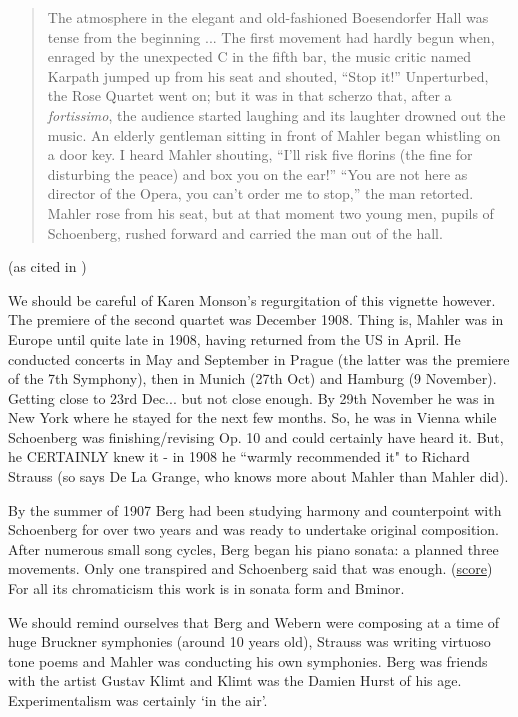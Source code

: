 \begin{quotation}
The atmosphere in the elegant and old-fashioned Boesendorfer Hall was tense from the beginning ... The first 
movement had hardly begun when, enraged by the unexpected C in the fifth bar, the music critic named Karpath 
jumped up from his seat and shouted, ``Stop it!'' Unperturbed, the Rose Quartet went on; but it was in that 
scherzo that, after a \textit{fortissimo}, the audience started laughing and its laughter drowned out the 
music. An elderly gentleman sitting in front of Mahler began whistling on a door key. I heard Mahler 
shouting, ``I'll risk five florins (the fine for disturbing the peace) and box you on the ear!'' ``You are 
not here as director of the Opera, you can't order me to stop,'' the man retorted. Mahler rose from his seat, 
but at that moment two young men, pupils of Schoenberg, rushed forward and carried the man out of the hall.
\citep[p32]{monson1979alban}
\end{quotation} 

\citet{featherstone00} (as cited in \citealt{thomas02})

We should be careful of Karen Monson's  regurgitation of this vignette however. The premiere of the second 
quartet was December 1908. Thing is, Mahler was in Europe until quite late in 1908, having returned from the 
US in April. He conducted concerts in May and September in Prague (the latter was the premiere of the 7th 
Symphony), then in Munich (27th Oct) and Hamburg (9 November). Getting close to 23rd Dec... but not close 
enough. By 29th November he was in New York where he stayed for the next few months. So, he was in Vienna 
while Schoenberg was finishing/revising Op. 10 and could certainly have heard it. But, he CERTAINLY knew it - 
in 1908 he ``warmly recommended it" to Richard Strauss (so says De La Grange, who knows more about Mahler 
than Mahler did). 

By the summer of 1907 Berg had been studying harmony and counterpoint with Schoenberg for over two years and was ready to undertake original composition. After numerous small song cycles, Berg began his piano sonata: a planned three movements. Only one transpired and Schoenberg said that was enough. (\href{http://petrucci.mus.auth.gr/imglnks/usimg/7/75/IMSLP234327-SIBLEY1802.21900.4ff7-39087012041663score.pdf}{score})
For all its chromaticism this work is in sonata form and Bminor. 

We should remind ourselves that Berg and Webern were composing at a time of huge Bruckner symphonies (around 10 years old), Strauss was writing virtuoso tone poems and Mahler was conducting his own symphonies. 
Berg was friends with the artist Gustav Klimt and Klimt was the Damien Hurst of his age. Experimentalism was certainly `in the air'.

